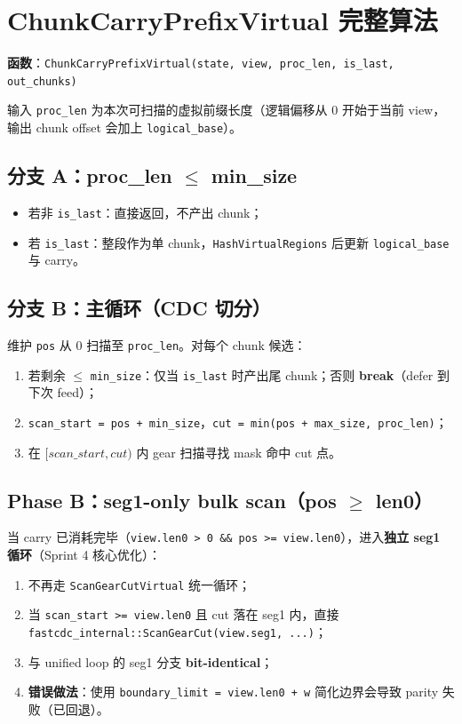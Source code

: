 \section{ChunkCarryPrefixVirtual 完整算法}

\textbf{函数}：\texttt{ChunkCarryPrefixVirtual(state, view, proc\_len, is\_last, out\_chunks)}

输入 \texttt{proc\_len} 为本次可扫描的虚拟前缀长度（逻辑偏移从 0 开始于当前 view，输出 chunk offset 会加上 \texttt{logical\_base}）。

\subsection{分支 A：proc\_len $\leq$ min\_size}

\begin{itemize}[nosep]
  \item 若非 \texttt{is\_last}：直接返回，不产出 chunk；
  \item 若 \texttt{is\_last}：整段作为单 chunk，\texttt{HashVirtualRegions} 后更新 \texttt{logical\_base} 与 carry。
\end{itemize}

\subsection{分支 B：主循环（CDC 切分）}

维护 \texttt{pos} 从 0 扫描至 \texttt{proc\_len}。对每个 chunk 候选：
\begin{enumerate}
  \item 若剩余 $\leq$ \texttt{min\_size}：仅当 \texttt{is\_last} 时产出尾 chunk；否则 \textbf{break}（defer 到下次 feed）；
  \item \texttt{scan\_start = pos + min\_size}，\texttt{cut = min(pos + max\_size, proc\_len)}；
  \item 在 $[scan\_start, cut)$ 内 gear 扫描寻找 mask 命中 cut 点。
\end{enumerate}

\subsection{Phase B：seg1-only bulk scan（pos $\geq$ len0）}

当 carry 已消耗完毕（\texttt{view.len0 > 0 \&\& pos >= view.len0}），进入\textbf{独立 seg1 循环}（Sprint 4 核心优化）：

\begin{designbox}[Phase B 要点]
\begin{enumerate}[nosep]
  \item 不再走 \texttt{ScanGearCutVirtual} 统一循环；
  \item 当 \texttt{scan\_start >= view.len0} 且 cut 落在 seg1 内，直接 \texttt{fastcdc\_internal::ScanGearCut(view.seg1, ...)}；
  \item 与 unified loop 的 seg1 分支 \textbf{bit-identical}；
  \item \textbf{错误做法}：使用 \texttt{boundary\_limit = view.len0 + w} 简化边界会导致 parity 失败（已回退）。
\end{enumerate}
\end{designbox}

